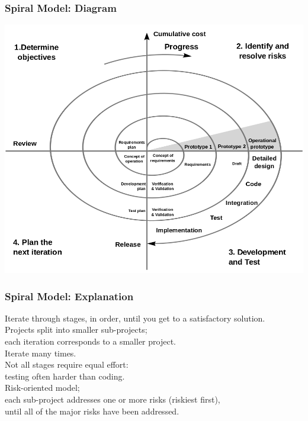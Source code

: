 \begin{frame}
\frametitle{Spiral Model: Diagram}


\begin{center}
\includegraphics[height=.7\textheight]{images/spiral-boehm.png}
\end{center}
\end{frame}

\begin{frame}
\frametitle{Spiral Model: Explanation}
\begin{changemargin}{1.5cm}

Iterate through stages, in order, until you get to
a satisfactory solution. \\[1em]

Projects split into smaller
sub-projects; \\
each iteration corresponds to a smaller project.\\[1em]

Iterate many times. \\[2em]

Not all stages require equal effort: \\
testing often harder than coding.\\[1em]

Risk-oriented model; \\
each sub-project addresses
one or more risks (riskiest first), \\
until all of the major risks
have been addressed. 
\end{changemargin}
\end{frame}

